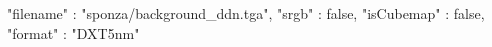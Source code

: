 { 
	"filename" : "sponza/background_ddn.tga", 
	"srgb" : false,
	"isCubemap" : false,
	"format" : "DXT5nm"
}